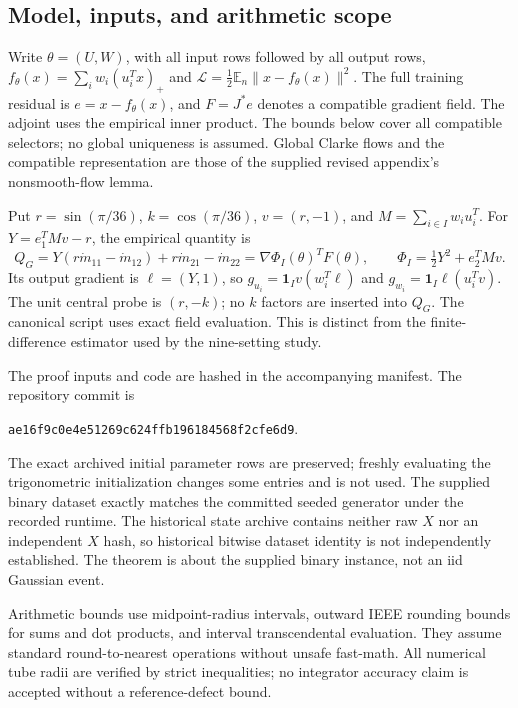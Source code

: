 \providecommand{\E}{\mathbb E}
\subsection{Model, inputs, and arithmetic scope}
Write $\theta=(U,W)$, with all input rows followed by all output rows,
$f_\theta(x)=\sum_iw_i(u_i^Tx)_+$ and
$\mathcal L=\frac12\mathbb E_n\|x-f_\theta(x)\|^2$.
The full training residual is $e=x-f_\theta(x)$, and $F=J^*e$ denotes a
compatible gradient field. The adjoint uses the empirical inner product.
The bounds below cover all compatible selectors; no global uniqueness is
assumed. Global Clarke flows and the compatible representation are those
of the supplied revised appendix's nonsmooth-flow lemma.

Put $r=\sin(\pi/36)$, $k=\cos(\pi/36)$, $v=(r,-1)$, and
$M=\sum_{i\in I}w_iu_i^T$. For $Y=e_1^TMv-r$, the empirical quantity is
\[
 Q_G=Y(r\dot m_{11}-\dot m_{12})+r\dot m_{21}-\dot m_{22}
     =\nabla\Phi_I(\theta)^TF(\theta),\qquad
 \Phi_I=\tfrac12Y^2+e_2^TMv.
\]
Its output gradient is $\ell=(Y,1)$, so
$g_{u_i}=\mathbf1_Iv(w_i^T\ell)$ and
$g_{w_i}=\mathbf1_I\ell(u_i^Tv)$.
The unit central probe is $(r,-k)$; no $k$ factors are inserted into $Q_G$.
The canonical script uses exact field evaluation. This is distinct from the
finite-difference estimator used by the nine-setting study.

The proof inputs and code are hashed in the accompanying manifest. The
repository commit is
\begin{center}\texttt{ae16f9c0e4e51269c624ffb196184568f2cfe6d9}.\end{center}
The exact archived initial parameter rows are preserved; freshly evaluating
the trigonometric initialization changes some entries and is not used.
The supplied binary dataset exactly matches the committed seeded generator
under the recorded runtime. The historical state archive contains neither
raw $X$ nor an independent $X$ hash, so historical bitwise dataset identity
is not independently established. The theorem is about the supplied binary
instance, not an iid Gaussian event.

Arithmetic bounds use midpoint-radius intervals, outward IEEE rounding
bounds for sums and dot products, and interval transcendental evaluation.
They assume standard round-to-nearest operations without unsafe fast-math.
All numerical tube radii are verified by strict inequalities; no integrator
accuracy claim is accepted without a reference-defect bound.

